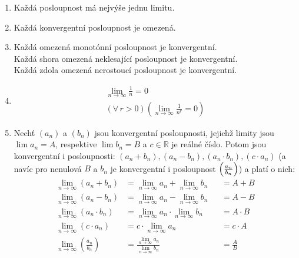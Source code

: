 \documentclass[12pt]{article}
\begin{document}
\begin{enumerate}
\item Každá posloupnost má nejvýše jednu limitu.
\item Každá konvergentní posloupnost je omezená.
\item Každá omezená monotónní posloupnost je konvergentní.\\
Každá shora omezená neklesající posloupnost je konvergentní.\\
Každá zdola omezená nerostoucí posloupnost je konvergentní.
\item 
\begin{align}
\lim_{n \to \infty} \frac{1}{n} = 0\\
\left( \forall \, r>0 \right) \left( \lim_{n \to \infty} \frac{1}{n^r} = 0 \right)
\end{align}
\item Nechť $(a_n)$ a $(b_n)$ jsou konvergentní posloupnosti, jejichž limity jsou $ \lim a_n = A$, respektive $ \lim b_n = B$ a $c \in \mathbb{R}$ je reálné číslo. Potom jsou konvergentní i posloupnosti: $(a_n + b_n), (a_n - b_n), (a_n \cdot b_n), (c \cdot a_n )$  (a navíc pro nenulová $B$ a $b_n$ je konvergentní i posloupnost $\left( \small \frac{ a_n}{b_n} \right)$) a platí o nich:
\begin{align}
\lim_{n \to \infty} (a_n + b_n) &= \lim_{n \to \infty}a_n + \lim_{n \to \infty} b_n &&= A + B\\
\lim_{n \to \infty} (a_n - b_n) &= \lim_{n \to \infty}a_n - \lim_{n \to \infty} b_n &&= A - B\\
\lim_{n \to \infty} (a_n \cdot b_n) &= \lim_{n \to \infty}a_n \cdot \lim_{n \to \infty} b_n &&= A \cdot B\\
\lim_{n \to \infty} (c \cdot a_n ) &= c \cdot \lim_{n \to \infty}a_n &&= c \cdot A\\
\lim_{n \to \infty} \left(\frac{a_n}{b_n} \right) &= \frac{\lim\limits_{n \to \infty} a_n}{\lim\limits_{n \to \infty} b_n} &&=\frac{A}{B}
\end{align}
\end{enumerate}
\end{document}
